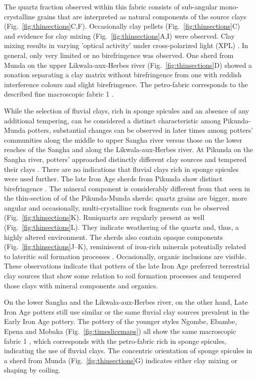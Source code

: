 \documentclass[smallextended,natbib]{svjour3}       %
\begin{document}
The quartz fraction observed within this fabric consists of sub-angular mono-crystalline grains that are interpreted as natural components of the source clays (Fig.~\ref{fig:thinsections}C,F). Occasionally clay pellets (Fig.~\ref{fig:thinsections}C) and evidence for clay mixing (Fig.~\ref{fig:thinsections}A,I) were observed. Clay mixing results in varying 'optical activity' under cross-polarized light (XPL) \citep{Whitbread.1986}. In general, only very limited or no birefringence was observed. One sherd from Munda on the upper Likwala-aux-Herbes river (Fig.~\ref{fig:thinsections}D) showed a zonation separating a clay matrix without birefringence from one with reddish interference colours and slight birefringence. The petro-fabric corresponds to the described fine macroscopic fabric 1 \citep[60--69]{Seidensticker.2021e}. 
 
While the selection of fluvial clays, rich in sponge spicules and an absence of any additional tempering, can be considered a distinct characteristic among Pikunda-Munda potters, substantial changes can be observed in later times among potters' communities along the middle to upper Sangha river versus those on the lower reaches of the Sangha and along the Likwala-aux-Herbes river. At Pikunda on the Sangha river, potters' approached distinctly different clay sources and tempered their clays \citep{Seidensticker.2016b,Seidensticker.2020}. There are no indications that fluvial clays rich in sponge spicules were used further. The late Iron Age sherds from Pikunda show distinct birefringence \citep[b-fabric; Fig.~\ref{fig:thinsections}K--L;][131--141]{Stoops.2021}. The mineral component is considerably different from that seen in the thin-section of of the Pikunda-Munda sherds: quartz grains are bigger, more angular and occasionally, multi-crystalline rock fragments can be observed (Fig.~\ref{fig:thinsections}K). Runiquartz \citep[673 Fig.~6]{Marcelino.2018} are regularly present as well (Fig.~\ref{fig:thinsections}L). They indicate weathering of the quartz and, thus, a highly altered environment. The sherds also contain opaque components (Fig.~\ref{fig:thinsections}J--K), reminiscent of iron-rich minerals potentially related to lateritic soil formation processes \citep[351--352]{Scheffer.2010}. Occasionally, organic inclusions are visible. These observations indicate that potters of the late Iron Age preferred terrestrial clay sources that show some relation to soil formation processes and tempered those clays with mineral components and organics.

On the lower Sangha and the Likwala-aux-Herbes river, on the other hand, Late Iron Age potters still use similar or the same fluvial clay sources prevalent in the Early Iron Age pottery. The pottery of the younger styles Ngombe, Ebambe, Epena and Mobaka (Fig.~\ref{fig:timeslicemaps}) all show the same macroscopic fabric 1 \citep[69 Tab.~12]{Seidensticker.2021e}, which corresponds with the petro-fabric rich in sponge spicules, indicating the use of fluvial clays. The concentric orientation of sponge spicules in a sherd from Munda (Fig.~\ref{fig:thinsections}G) indicates either clay mixing or shaping by coiling.
\end{document}
